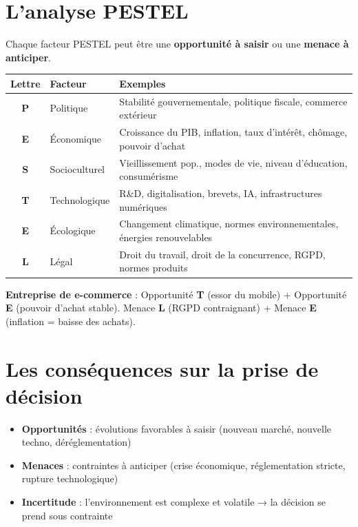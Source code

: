 \documentclass[11pt,a4paper]{article}
\begin{document}
\section*{L'analyse PESTEL}

\begin{keybox}
Chaque facteur PESTEL peut être une \textbf{opportunité à saisir} ou une \textbf{menace à anticiper}.
\end{keybox}

\vspace{4pt}
\begin{tabular}{|c|l|l|}
\hline
\textbf{Lettre} & \textbf{Facteur} & \textbf{Exemples} \\
\hline
\textbf{P} & Politique & Stabilité gouvernementale, politique fiscale, commerce extérieur \\
\textbf{E} & Économique & Croissance du PIB, inflation, taux d'intérêt, chômage, pouvoir d'achat \\
\textbf{S} & Socioculturel & Vieillissement pop., modes de vie, niveau d'éducation, consumérisme \\
\textbf{T} & Technologique & R\&D, digitalisation, brevets, IA, infrastructures numériques \\
\textbf{E} & Écologique & Changement climatique, normes environnementales, énergies renouvelables \\
\textbf{L} & Légal & Droit du travail, droit de la concurrence, RGPD, normes produits \\
\hline
\end{tabular}

\vspace{6pt}
\begin{exbox}
\textbf{Entreprise de e-commerce} : Opportunité \textbf{T} (essor du mobile) + Opportunité \textbf{E} (pouvoir d'achat stable). Menace \textbf{L} (RGPD contraignant) + Menace \textbf{E} (inflation = baisse des achats).
\end{exbox}

\section*{Les conséquences sur la prise de décision}

\begin{itemize}
  \item \textbf{Opportunités} : évolutions favorables à saisir (nouveau marché, nouvelle techno, déréglementation)
  \item \textbf{Menaces} : contraintes à anticiper (crise économique, réglementation stricte, rupture technologique)
  \item \textbf{Incertitude} : l'environnement est complexe et volatile → la décision se prend sous contrainte
\end{itemize}
\end{document}

